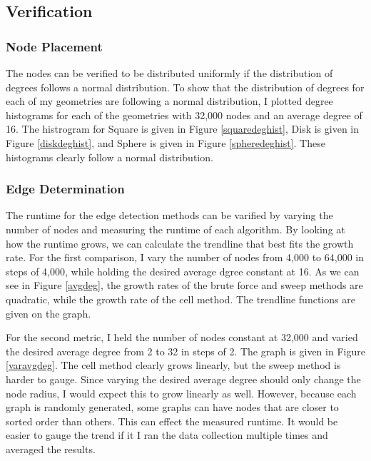 \documentclass{article}
\begin{document}
    \subsection{Verification}

        \subsubsection{Node Placement}
        The nodes can be verified to be distributed uniformly if the distribution of degrees follows a normal distribution. To show that the distribution of degrees for each of my geometries are following a normal distribution, I plotted degree histograms for each of the geometries with 32,000 nodes and an average degree of 16. The histrogram for Square is given in Figure \ref{squaredeghist}, Disk is given in Figure \ref{diskdeghist}, and Sphere is given in Figure \ref{spheredeghist}. These histograms clearly follow a normal distribution.

        \subsubsection{Edge Determination}
        The runtime for the edge detection methods can be varified by varying the number of nodes and measuring the runtime of each algorithm. By looking at how the runtime grows, we can calculate the trendline that best fits the growth rate. For the first comparison, I vary the number of nodes from 4,000 to 64,000 in steps of 4,000, while holding the desired average dgree constant at 16. As we can see in Figure \ref{avgdeg}, the growth rates of the brute force and sweep methods are quadratic, while the growth rate of the cell method. The trendline functions are given on the graph.
        \par
        For the second metric, I held the number of nodes constant at 32,000 and varied the desired average degree from 2 to 32 in steps of 2. The graph is given in Figure \ref{varavgdeg}. The cell method clearly grows linearly, but the sweep method is harder to gauge. Since varying the desired average degree should only change the node radius, I would expect this to grow linearly as well. However, because each graph is randomly generated, some graphs can have nodes that are closer to sorted order than others. This can effect the measured runtime. It would be easier to gauge the trend if it I ran the data collection multiple times and averaged the results.
\end{document}

